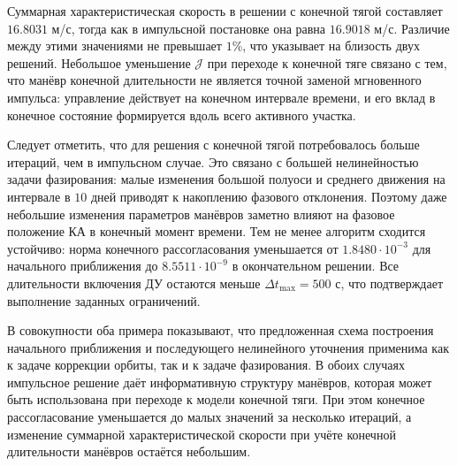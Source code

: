 Суммарная характеристическая скорость в решении с конечной тягой составляет $16.8031$ м/с, тогда как в импульсной постановке она равна $16.9018$ м/с. Различие между этими значениями не превышает $1\%$, что указывает на близость двух решений. Небольшое уменьшение $\mathcal{J}$ при переходе к конечной тяге связано с тем, что манёвр конечной длительности не является точной заменой мгновенного импульса: управление действует на конечном интервале времени, и его вклад в конечное состояние формируется вдоль всего активного участка.

Следует отметить, что для решения с конечной тягой потребовалось больше итераций, чем в импульсном случае. Это связано с большей нелинейностью задачи фазирования: малые изменения большой полуоси и среднего движения на интервале в $10$ дней приводят к накоплению фазового отклонения. Поэтому даже небольшие изменения параметров манёвров заметно влияют на фазовое положение КА в конечный момент времени. Тем не менее алгоритм сходится устойчиво: норма конечного рассогласования уменьшается от $1.8480 \cdot 10^{-3}$ для начального приближения до $8.5511 \cdot 10^{-9}$ в окончательном решении. Все длительности включения ДУ остаются меньше $\Delta t_{\text{max}}=500$ с, что подтверждает выполнение заданных ограничений.

В совокупности оба примера показывают, что предложенная схема построения начального приближения и последующего нелинейного уточнения применима как к задаче коррекции орбиты, так и к задаче фазирования. В обоих случаях импульсное решение даёт информативную структуру манёвров, которая может быть использована при переходе к модели конечной тяги. При этом конечное рассогласование уменьшается до малых значений за несколько итераций, а изменение суммарной характеристической скорости при учёте конечной длительности манёвров остаётся небольшим.
